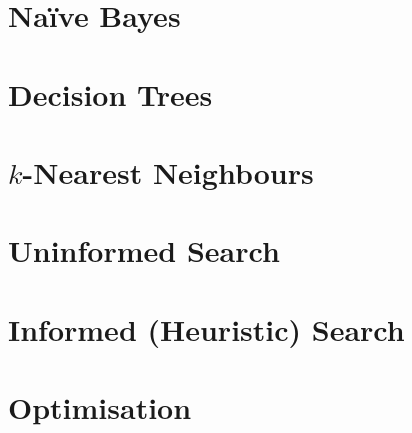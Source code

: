 \documentclass[
  11pt,
  a4paper,
]{article}
\begin{document}
\section{Na\"{i}ve Bayes}


\section{Decision Trees}


\section{\texorpdfstring{\( k \)}{k}-Nearest Neighbours}


\section{Uninformed Search}


\section{Informed (Heuristic) Search}


\section{Optimisation}

\end{document}
